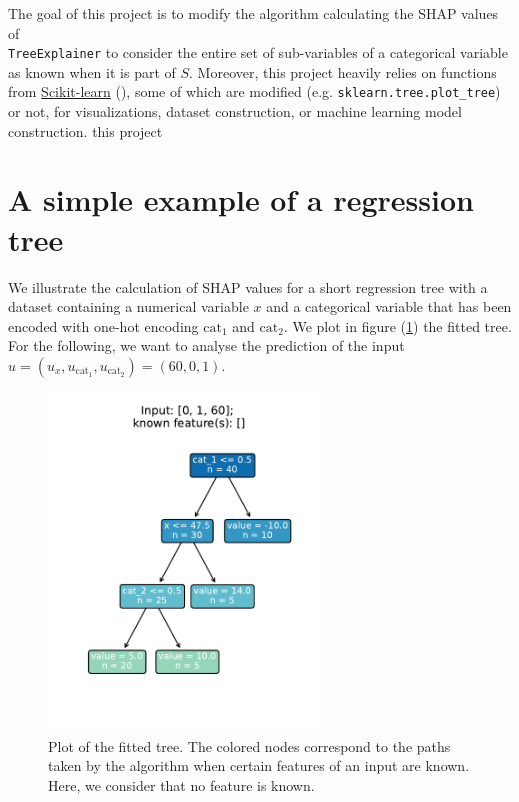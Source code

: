 \documentclass[11pt]{article}
\begin{document}
The goal of this project is to modify the algorithm calculating the SHAP values of \\ \texttt{TreeExplainer} to consider 
the entire set of sub-variables of a categorical variable as known when it is part of $S$. Moreover, this project 
heavily relies on functions from \href{https://scikit-learn.org/stable/}{Scikit-learn} (\cite{scikit-learn}), some of which are modified 
(e.g. \texttt{sklearn.tree.plot\_tree}) or not, for visualizations, dataset construction, or machine learning model construction.
this project 

\section*{A simple example of a regression tree}

We illustrate the calculation of SHAP values for a short regression tree with a dataset containing a 
numerical variable $x$ and a categorical variable that has been encoded with one-hot encoding $\text{cat}_1$ and $\text{cat}_2$.
We plot in figure (\ref{fig:tree0}) the fitted tree. For the following, we want to analyse the prediction of the input 
$u = (u_x, u_{\text{cat}_1}, u_{\text{cat}_2}) = (60,0,1)$.

\begin{figure}[H]
    \centering
    \includegraphics[height=9cm]{"../outputs/plot_tree/figures/path_0_known.pdf"}
    \caption{Plot of the fitted tree. The colored nodes correspond to the paths taken 
    by the algorithm when certain features of an input are known. Here, we consider that 
    no feature is known.}
    \label{fig:tree0}
\end{figure}
\end{document}
